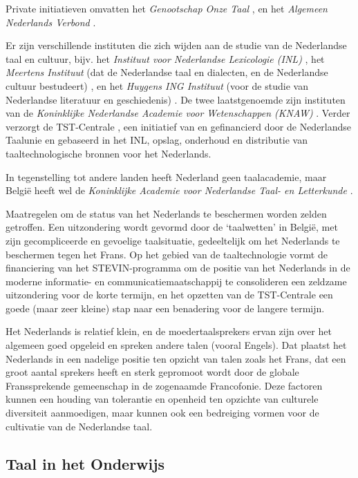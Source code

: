 \documentclass[]{../../metanetpaper}
\begin{document}
\begin{multicols}{2}
   Private initiatieven omvatten het \emph{Genootschap Onze Taal} \cite{OT}, en het \emph{Algemeen Nederlands Verbond} \cite{ANV}.

   Er zijn verschillende instituten die zich wijden aan de studie van de Nederlandse taal en cultuur, bijv. het \emph{Instituut voor Nederlandse Lexicologie (INL)} \cite{INL}, het \emph{Meertens Instituut} (dat de Nederlandse taal en dialecten, en de Nederlandse cultuur bestudeert) \cite{MI}, en het \emph{Huygens ING Instituut} (voor de studie van Nederlandse literatuur en geschiedenis) \cite{HING}. De twee laatstgenoemde zijn instituten van de \emph{Koninklijke Nederlandse Academie voor Wetenschappen (KNAW)} \cite{KNAW}.  Verder verzorgt de TST-Centrale \cite{TST-Centrale}, een initiatief van en gefinancierd door de Nederlandse Taalunie en gebaseerd in het INL, opslag, onderhoud en distributie van taaltechnologische bronnen voor het Nederlands.

   In tegenstelling tot andere landen heeft Nederland geen taalacademie, maar Belgi{\"e} heeft wel de \emph{Koninklijke Academie voor Nederlandse Taal- en Letterkunde} \cite{Kantl}.


   Maatregelen om de status van het Nederlands te beschermen worden zelden getroffen. Een uitzondering wordt gevormd door de `taalwetten' in Belgi{\"e}, met zijn gecompliceerde en gevoelige taalsituatie, gedeeltelijk om het Nederlands te beschermen tegen het Frans. Op het gebied van de taaltechnologie vormt de financiering van het STEVIN-programma om de positie van het Nederlands in de moderne informatie- en communicatiemaatschappij te consolideren een zeldzame uitzondering voor de korte termijn, en het opzetten van de TST-Centrale een goede (maar zeer kleine) stap naar een benadering voor de langere termijn.

   Het Nederlands is relatief klein, en de moedertaalsprekers ervan zijn over het algemeen goed opgeleid en spreken andere talen (vooral Engels). Dat plaatst het Nederlands in een nadelige positie ten opzicht van talen zoals het Frans, dat een groot aantal sprekers heeft en sterk gepromoot wordt door de globale Franssprekende gemeenschap in de zogenaamde Francofonie. Deze factoren kunnen een houding van tolerantie en openheid ten opzichte van culturele diversiteit aanmoedigen, maar kunnen ook een bedreiging vormen voor de cultivatie van de Nederlandse taal.

\subsection{Taal in het Onderwijs}


\end{multicols}
\end{document}
